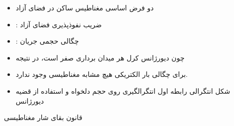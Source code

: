 \ELhold


\begin{ELjoin}

\begin{itemize}
\tightlist
\item
  دو فرض اساسی مغناطیس ساکن در فضای آزاد
\end{itemize}

\begin{ELimportant}{}


\end{ELimportant}

\end{ELjoin}

\begin{ELunit}

\begin{itemize}
\tightlist
\item
  : ضریب نفوذپذیری فضای آزاد
\item
  : چگالی حجمی جریان 
\item
  چون دیورژانس کرل هر میدان برداری صفر است، در نتیجه
\end{itemize}


\end{ELunit}

\begin{ELjoin}

\begin{itemize}
\tightlist
\item
  برای چگالی بار الکتریکی هیچ مشابه مغناطیسی وجود ندارد.
\item
  شکل انتگرالی رابطه اول \ELim{\ELto} انتگرالگیری روی حجم دلخواه  و استفاده از قضیه دیورژانس
\end{itemize}

\begin{ELimportant}{قانون بقای شار مغناطیسی}


\end{ELimportant}

\end{ELjoin}

